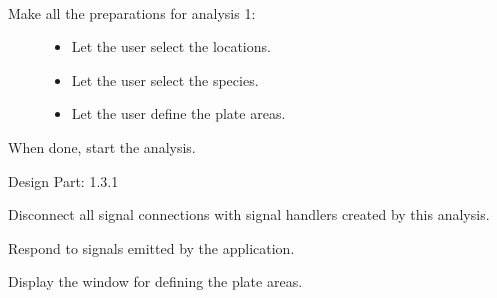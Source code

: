 \documentclass[letterpaper,10pt,english]{sphinxmanual}
\begin{document}
\begin{fulllineitems}
\label{setlyze/analysis/spot_preference:setlyze.analysis.spot_preference.Begin}~\begin{description}
\item[{Make all the preparations for analysis 1:}] \leavevmode\begin{itemize}
\item {} 
Let the user select the locations.

\item {} 
Let the user select the species.

\item {} 
Let the user define the plate areas.

\end{itemize}

\end{description}

When done, start the analysis.

Design Part: 1.3.1

\begin{fulllineitems}
\label{setlyze/analysis/spot_preference:setlyze.analysis.spot_preference.Begin.destroy_handler_connections}
Disconnect all signal connections with signal handlers
created by this analysis.

\end{fulllineitems}


\begin{fulllineitems}
\label{setlyze/analysis/spot_preference:setlyze.analysis.spot_preference.Begin.handle_application_signals}
Respond to signals emitted by the application.

\end{fulllineitems}


\begin{fulllineitems}
\label{setlyze/analysis/spot_preference:setlyze.analysis.spot_preference.Begin.on_define_plate_areas}
Display the window for defining the plate areas.


\end{fulllineitems}
\end{fulllineitems}
\end{document}
